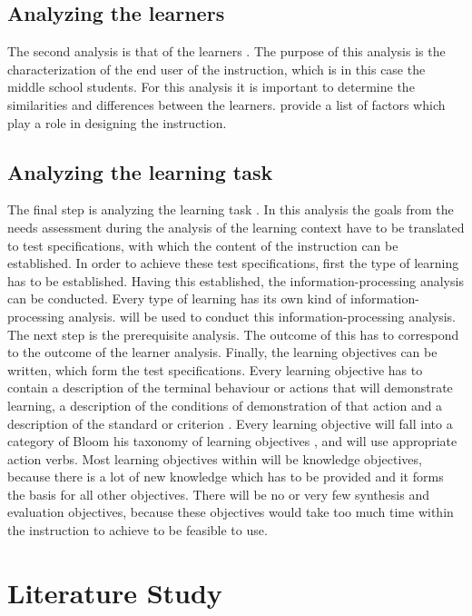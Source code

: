 \documentclass[12pt]{report} %
\begin{document}
\subsection{Analyzing the learners}

The second analysis is that of the learners \cite{smithragan}. The purpose of this analysis is the characterization of the end user of the instruction, which is in this case the middle school students. For this analysis it is important to determine the similarities and differences between the learners.  provide a list of factors which play a role in designing the instruction.

\subsection{Analyzing the learning task}

The final step is analyzing the learning task \cite{smithragan}. In this analysis the goals from the needs assessment during the analysis of the learning context have to be translated to test specifications, with which the content of the instruction can be established. In order to achieve these test specifications, first the type of learning has to be established. Having this established, the information-processing analysis can be conducted. Every type of learning has its own kind of information-processing analysis.  will be used to conduct this information-processing analysis. The next step is the prerequisite analysis. The outcome of this has to correspond to the outcome of the learner analysis. Finally, the learning objectives can be written, which form the test specifications. Every learning objective has to contain a description of the terminal behaviour or actions that will demonstrate learning, a description of the conditions of demonstration of that action and a description of the standard or criterion \cite{smithragan}. Every learning objective will fall into a category of Bloom his taxonomy of learning objectives \cite{bloom}, and will use appropriate action verbs. Most learning objectives within will be knowledge objectives, because there is a lot of new knowledge which has to be provided and it forms the basis for all other objectives. There will be no or very few synthesis and evaluation objectives, because these objectives would take too much time within the instruction to achieve to be feasible to use.

\section{Literature Study}
\end{document}
